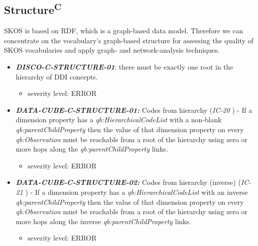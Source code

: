 \documentclass{llncs}
\begin{document}
\subsection{Structure\textsuperscript{C}}

SKOS is based on RDF, which is a graph-based data model. Therefore we can concentrate on the vocabulary's graph-based structure for assessing the quality of SKOS vocabularies and apply graph- and network-analysis techniques. 

\begin{itemize}
	\item \textbf{{\em DISCO-C-STRUCTURE-01}}: there must be exactly one root in the hierarchy of DDI concepts. 
	\begin{itemize}
		\item severity level: ERROR
	\end{itemize}
\end{itemize} 

\begin{itemize}
	\item \textbf{{\em DATA-CUBE-C-STRUCTURE-01:}}
	Codes from hierarchy (\emph{IC-20} \cite{CyganiakReynolds2014}) -  
	If a dimension property has a \emph{qb:HierarchicalCodeList} with a non-blank \emph{qb:parentChildProperty} then the value of that dimension property on every \emph{qb:Observation} must be reachable from a root of the hierarchy using zero or more hops along the \emph{qb:parentChildProperty} links. 
	\begin{itemize}
		\item severity level: ERROR
	\end{itemize}
	\item \textbf{{\em DATA-CUBE-C-STRUCTURE-02:}}
	Codes from hierarchy (inverse) (\emph{IC-21} \cite{CyganiakReynolds2014}) -  
	If a dimension property has a \emph{qb:HierarchicalCodeList} with an inverse \emph{qb:parentChildProperty} then the value of that dimension property on every \emph{qb:Observation} must be reachable from a root of the hierarchy using zero or more hops along the inverse \emph{qb:parentChildProperty} links. 
	\begin{itemize}
		\item severity level: ERROR
	\end{itemize}
\end{itemize}
\end{document}
